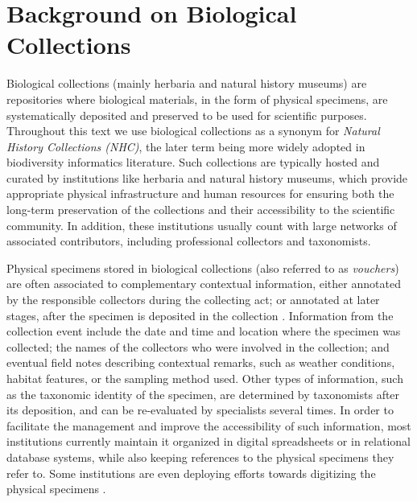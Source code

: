 \chapter{Background on Biological Collections}\label{biodiversity_data}



Biological collections (mainly herbaria and natural history museums) are repositories where biological materials, in the form of physical specimens, are systematically deposited and preserved to be used for scientific purposes. 
Throughout this text we use biological collections as a synonym for \textit{Natural History Collections (NHC)}, the later term being more widely adopted in biodiversity informatics literature.
Such collections are typically hosted and curated by institutions like herbaria and natural history museums, which provide appropriate physical infrastructure and human resources for ensuring both the long-term preservation of the collections and their accessibility to the scientific community.
In addition, these institutions usually count with large networks of associated contributors, including professional collectors and taxonomists.

Physical specimens stored in biological collections (also referred to as \textit{vouchers}) are often associated to complementary contextual information, either annotated by the responsible collectors during the collecting act; or annotated at later stages, after the specimen is deposited in the collection \cite{Chapman2005}. %
Information from the collection event include the date and time and location where the specimen was collected; the names of the collectors who were involved in the collection; and eventual field notes describing contextual remarks, such as weather conditions, habitat features, or the sampling method used.
Other types of information, such as the taxonomic identity of the specimen, are determined by taxonomists after its deposition, and can be re-evaluated by specialists several times.
In order to facilitate the management and improve the accessibility of such information, most institutions currently maintain it organized in digital spreadsheets or in relational database systems, while also keeping references to the physical specimens they refer to.
Some institutions are even deploying efforts towards digitizing the physical specimens \cite{}.

